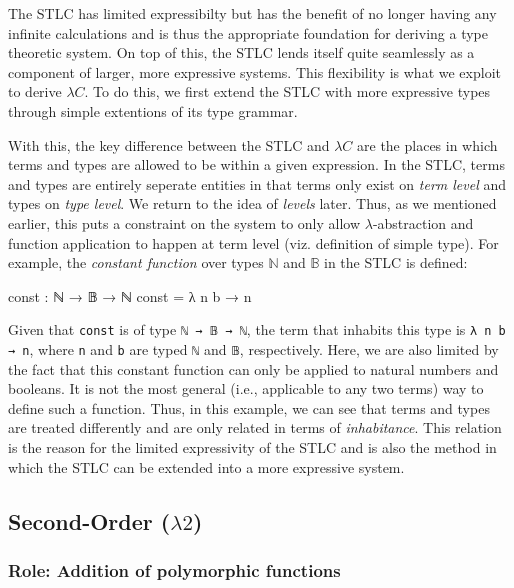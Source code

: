 \documentclass[12pt]{article}
\begin{document}
The STLC has limited expressibilty but has the benefit of no longer having any
infinite calculations \cite{} and is thus the appropriate foundation for
deriving a type theoretic system. On top of this, the STLC lends itself quite
seamlessly as a component of larger, more expressive systems. This flexibility is
what we exploit to derive \(\lambda C\). To do this, we first extend the STLC
with more expressive types through simple extentions of its type grammar.

With this, the key difference between the STLC and \(\lambda C\) are the places
in which terms and types are allowed to be within a given expression. In the
STLC, terms and types are entirely seperate entities in that terms only exist on
{\em term level} and types on {\em type level}. We return to the idea of
{\em levels} later. Thus, as we mentioned earlier, this puts a constraint on the
system to only allow \(\lambda\)-abstraction and function application to happen
at term level (viz. definition of simple type). For example, the
{\em constant function} over types \(\mathbb{N}\) and \(\mathbb{B}\) in the STLC
is defined:
\begin{center}
\begin{minipage}{0.5\textwidth}
\begin{code}
const : ℕ → 𝔹 → ℕ
const = λ n b → n
\end{code}
\end{minipage}
\end{center}
Given that {\tt const} is of type {\tt ℕ → 𝔹 → ℕ}, the term that inhabits this
type is {\tt λ n b → n}, where {\tt n} and {\tt b} are typed {\tt ℕ} and {\tt 𝔹},
respectively. Here, we are also limited by the fact that this constant function can
only be applied to natural numbers and booleans. It is not the most general
(i.e., applicable to any two terms) way to define such a function. Thus, in this
example, we can see that terms and types are treated differently and are only
related in terms of {\em inhabitance}. This relation is the reason for the
limited expressivity of the STLC and is also the method in which the STLC can be
extended into a more expressive system.

\subsection*{Second-Order (\(\lambda2\))}
\subsubsection*{Role: Addition of polymorphic functions}
\end{document}
